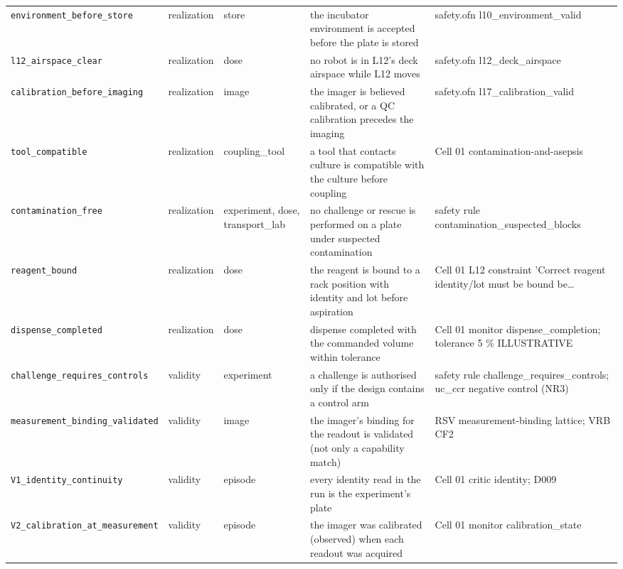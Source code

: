 \documentclass[10pt,a4paper]{article}
\begin{document}
{\begin{xltabular}{\linewidth}{p{3.2cm}lp{1.9cm}Xp{3.0cm}}
\texttt{environment\_\allowbreak{}before\_\allowbreak{}store} & realization & store & the incubator environment is accepted before the plate is stored & safety.ofn l10\_\allowbreak{}environment\_\allowbreak{}valid \\
\texttt{l12\_\allowbreak{}airspace\_\allowbreak{}clear} & realization & dose & no robot is in L12's deck airspace while L12 moves & safety.ofn l12\_\allowbreak{}deck\_\allowbreak{}airspace \\
\texttt{calibration\_\allowbreak{}before\_\allowbreak{}imaging} & realization & image & the imager is believed calibrated, or a QC calibration precedes the imaging & safety.ofn l17\_\allowbreak{}calibration\_\allowbreak{}valid \\
\texttt{tool\_\allowbreak{}compatible} & realization & coupling\_\allowbreak{}tool & a tool that contacts culture is compatible with the culture before coupling & Cell 01 contamination-and-asepsis \\
\texttt{contamination\_\allowbreak{}free} & realization & experiment, dose, transport\_\allowbreak{}lab & no challenge or rescue is performed on a plate under suspected contamination & safety rule contamination\_\allowbreak{}suspected\_\allowbreak{}blocks \\
\texttt{reagent\_\allowbreak{}bound} & realization & dose & the reagent is bound to a rack position with identity and lot before aspiration & Cell 01 L12 constraint 'Correct reagent identity/lot must be bound be… \\
\texttt{dispense\_\allowbreak{}completed} & realization & dose & dispense completed with the commanded volume within tolerance & Cell 01 monitor dispense\_\allowbreak{}completion; tolerance 5 \% ILLUSTRATIVE \\
\texttt{challenge\_\allowbreak{}requires\_\allowbreak{}controls} & validity & experiment & a challenge is authorised only if the design contains a control arm & safety rule challenge\_\allowbreak{}requires\_\allowbreak{}controls; uc\_\allowbreak{}ccr negative control (NR3) \\
\texttt{measurement\_\allowbreak{}binding\_\allowbreak{}validated} & validity & image & the imager's binding for the readout is validated (not only a capability match) & RSV measurement-binding lattice; VRB CF2 \\
\texttt{V1\_\allowbreak{}identity\_\allowbreak{}continuity} & validity & episode & every identity read in the run is the experiment's plate & Cell 01 critic identity; D009 \\
\texttt{V2\_\allowbreak{}calibration\_\allowbreak{}at\_\allowbreak{}measurement} & validity & episode & the imager was calibrated (observed) when each readout was acquired & Cell 01 monitor calibration\_\allowbreak{}state \\

\end{xltabular}}
\end{document}
